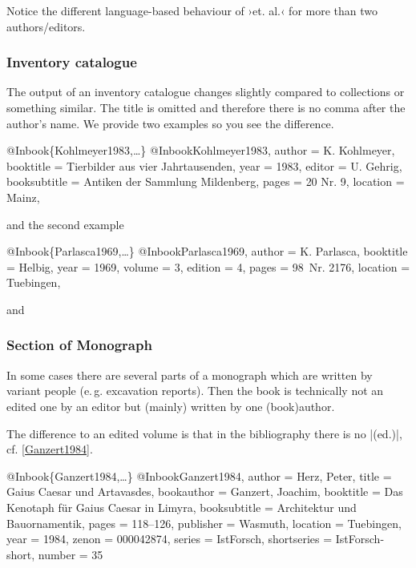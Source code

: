 \documentclass[a4paper,
10pt,
greek,
french,
spanish,
italian,
ngerman,
english,
]{ltxdoc}
\begin{document}
Notice the different language-based behaviour of ›et. al.‹ for more than two authors/editors.

 
\subsubsection{Inventory catalogue}
The output of an inventory catalogue changes slightly compared to collections or something similar. 
The title is omitted and therefore there is no comma after the author’s name.
We provide two examples so you see the difference.
\begin{bibexample}[label=Kohlmeyer1983]{{@}Inbook\{Kohlmeyer1983,…\}}
@Inbook{Kohlmeyer1983,
  author       = {K. Kohlmeyer},
  booktitle    = {Tierbilder aus vier Jahrtausenden},
  year         = {1983},
  editor       = {U. Gehrig},
  booksubtitle = {Antiken der Sammlung Mildenberg},
  pages        = {20 Nr. 9},
  location     = Mainz, %
}
\end{bibexample}
and the second example

\begin{bibexample}[label=Parlasca1969]{{@}Inbook\{Parlasca1969,…\}}
@Inbook{Parlasca1969,
  author    = {K. Parlasca},
  booktitle = {Helbig},
  year      = {1969},
  volume    = {3},
  edition   = {4},
  pages     = {98\psq\ Nr. 2176},
  location  = Tuebingen, %
}
\end{bibexample}


and

\subsubsection{Section of Monograph}
In some cases there are several parts of a monograph which are written by variant people (e.\,g. excavation reports). 
Then the book is technically not an edited one by an editor but (mainly) written by one (book)author. 

The difference to an edited volume is that in the bibliography   there is no |(ed.)|, cf. \cref{Ganzert1984}.


\begin{bibexample}[label=Ganzert1984]{{@}Inbook\{Ganzert1984,…\}}
@Inbook{Ganzert1984,
author = {Herz, Peter},
title = {Gaius Caesar und Artavasdes},
bookauthor = {Ganzert, Joachim},
booktitle = {Das Kenotaph für Gaius Caesar in Limyra},
booksubtitle = {Architektur und Bauornamentik},
pages = {118--126},
publisher = {Wasmuth},
location = Tuebingen,
year = {1984},
zenon = {000042874},
series = IstForsch,
shortseries = IstForsch-short,
number = {35}
}
\end{bibexample}
\end{document}
